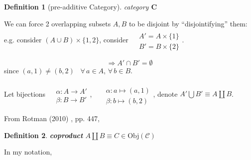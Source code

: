 \documentclass[10pt]{amsart}
\newtheorem{definition}{Definition}
\begin{document}
\begin{multicols*}{2}
\begin{definition}[pre-additive Category]
category $\mathbf{C}$
\end{definition}  





We can force 2 overlapping subsets $A,B$ to be disjoint by ``disjointifying'' them: e.g. consider $(A\cup B) \times \lbrace 1,2 \rbrace$, consider $\begin{aligned} & \quad \\
& A' = A\times \lbrace 1 \rbrace \\
& B' = B\times \lbrace 2 \rbrace \end{aligned}$.

\[
\Longrightarrow A' \cap B' = \emptyset 
\]
since $(a,1) \neq (b,2)$ \, $\forall \, a \in A$, $\forall \, b \in B$.

Let bijections $\begin{aligned} & \quad \\
& \alpha : A \to A' \\
& \beta : B \to B' \end{aligned}$, \qquad \, $\begin{aligned} & \quad \\
& \alpha : a \mapsto (a,1) \\
& \beta : b\mapsto (b,2) \end{aligned}$, denote $A'\bigcup B' \equiv A \coprod B$.

From Rotman (2010) \cite{JRotman2010}, pp. 447,
\begin{definition}
	\textbf{coproduct} $A \coprod B \equiv C \in \text{Obj}(\mathcal{C})$
\end{definition}

In my notation,


\end{multicols*}
\end{document}
